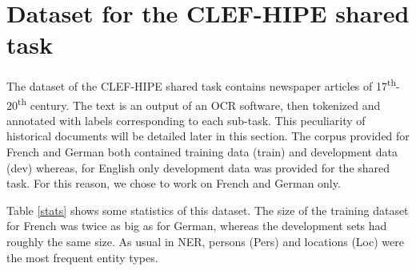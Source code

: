\section{Dataset for the CLEF-HIPE shared task}
\label{sec:dataset}

The dataset of the CLEF-HIPE shared task contains newspaper articles of 17\textsuperscript{th}-20\textsuperscript{th} century. The text is an output of an OCR software, then tokenized and annotated with labels corresponding to each sub-task. This peculiarity of historical documents will be detailed later in this section. The corpus provided for French and German both contained training data (train) and development data (dev) whereas, for English only development data was provided for the shared task. For this reason, we chose to work on French and German only.

Table \ref{stats} shows some statistics of this dataset. The size of the training dataset for French was twice as big as for German, whereas the development sets had roughly the same size. As usual in NER, persons (Pers) and locations (Loc) were the most frequent entity types.

